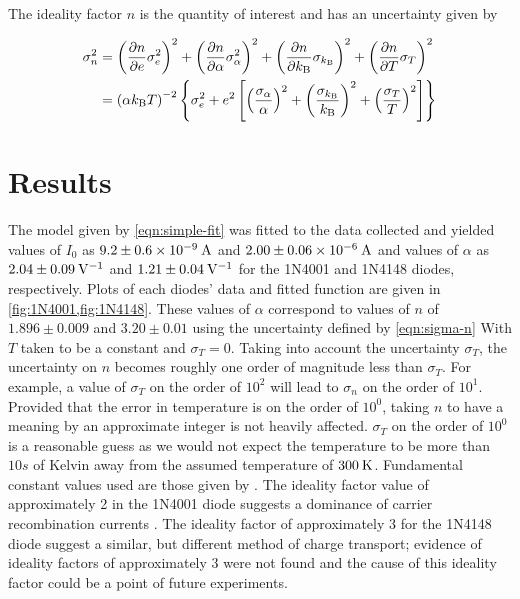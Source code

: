 \documentclass[reprint]{revtex4-1}
\begin{document}
The ideality factor $n$ is the quantity of interest and has an uncertainty given by 

\begin{equation} \label{eqn:sigma-n}
\begin{split}
\sigma_n^2 &= \left( \frac{\partial n}{\partial e} \sigma_e^2 \right)^2 + \left( \frac{\partial n}{\partial \alpha} \sigma_{\alpha}^2 \right)^2 + \left( \frac{\partial n}{\partial k_{\rm{B}}} \sigma_{k_{\rm{B}}} \right)^2 + \left( \frac{\partial n}{\partial T} \sigma_T \right)^2 \\
&= \left( \alpha k_{\rm{B}} T \right)^{-2} \left\{ \sigma_e^2 + e^2 \left[  \left( \frac{\sigma_{\alpha}}{\alpha} \right)^2 + \left( \frac{\sigma_{k_{\rm{B}}}}{k_{\rm{B}}} \right)^2 + \left( \frac{\sigma_T}{T} \right)^2  \right] \right\}
\end{split}
\end{equation}


\section{Results}

The model given by \cref{eqn:simple-fit} was fitted to the data collected and yielded values of $I_0$ as $9.2 \pm 0.6 \times 10^{-9}\:\rm{A}$ and $2.00 \pm 0.06 \times 10^{-6}\:\rm{A}$ and values of $\alpha$ as $2.04 \pm 0.09\:\rm{V}^{-1}$ and $1.21 \pm 0.04\:\rm{V}^{-1}$ for the \textsc{1N4001} and \textsc{1N4148} diodes, respectively. Plots of each diodes' data and fitted function are given in \cref{fig:1N4001,fig:1N4148}. These values of $\alpha$ correspond to values of $n$ of $1.896 \pm 0.009$ and $3.20 \pm 0.01$ using the uncertainty defined by \cref{eqn:sigma-n} With $T$ taken to be a constant and $\sigma_T = 0$. Taking into account the uncertainty $\sigma_T$, the uncertainty on $n$ becomes roughly one order of magnitude less than $\sigma_T$. For example, a value of $\sigma_T$ on the order of $10^2$ will lead to $\sigma_n$ on the order of $10^1$. Provided that the error in temperature is on the order of $10^0$, taking $n$ to have a meaning by an approximate integer is not heavily affected. $\sigma_T$ on the order of $10^0$ is a reasonable guess as we would not expect the temperature to be more than $10s$ of Kelvin away from the assumed temperature of $300\:\rm{K}$. Fundamental constant values used are those given by \cite{NIST2014}. The ideality factor value of approximately 2 in the \textsc{1N4001} diode suggests a dominance of carrier recombination currents \cite{Shockley1952}. The ideality factor of approximately 3 for the \textsc{1N4148} diode suggest a similar, but different method of charge transport; evidence of ideality factors of approximately 3 were not found and the cause of this ideality factor could be a point of future experiments.
\end{document}
